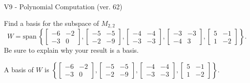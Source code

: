 \begin{exercise}
  \begin{exerciseTitle}V9 - Polynomial Computation (ver. 62)\end{exerciseTitle}
  \begin{exerciseStatement}
    Find a basis for the subspace of \(M_{2,2}\) 
\[W=\mathrm{span}\ \left\{\left[\begin{array}{cc}
-6 & -2 \\
-3 & 0
\end{array}\right] , \left[\begin{array}{cc}
-5 & -5 \\
-2 & -9
\end{array}\right] , \left[\begin{array}{cc}
-4 & -4 \\
-3 & -3
\end{array}\right] , \left[\begin{array}{cc}
-3 & -3 \\
-4 & 3
\end{array}\right] , \left[\begin{array}{cc}
5 & -1 \\
1 & -2
\end{array}\right]\right\}.\]
 Be sure to explain why your result is a basis.


  \end{exerciseStatement}
  \begin{exerciseAnswer}
   A basis of \(W\) is  \(\left\{\left[\begin{array}{cc}
-6 & -2 \\
-3 & 0
\end{array}\right] , \left[\begin{array}{cc}
-5 & -5 \\
-2 & -9
\end{array}\right] , \left[\begin{array}{cc}
-4 & -4 \\
-3 & -3
\end{array}\right] , \left[\begin{array}{cc}
5 & -1 \\
1 & -2
\end{array}\right]\right\}\).
  


  \end{exerciseAnswer}
\end{exercise}